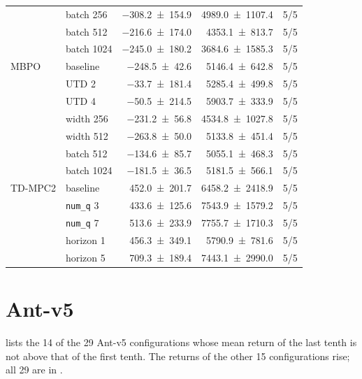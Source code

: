 {\begin{longtable}{@{}llrrr@{}}
     & batch 256 & \num{-308.2+-154.9} & \num{4989.0+-1107.4} & \num{5}/\num{5} \\
     & batch 512 & \num{-216.6+-174.0} & \num{4353.1+-813.7} & \num{5}/\num{5} \\
     & batch 1024 & \num{-245.0+-180.2} & \num{3684.6+-1585.3} & \num{5}/\num{5} \\
    \midrule
    MBPO & baseline & \num{-248.5+-42.6} & \num{5146.4+-642.8} & \num{5}/\num{5} \\
     & UTD 2 & \num{-33.7+-181.4} & \num{5285.4+-499.8} & \num{5}/\num{5} \\
     & UTD 4 & \num{-50.5+-214.5} & \num{5903.7+-333.9} & \num{5}/\num{5} \\
     & width 256 & \num{-231.2+-56.8} & \num{4534.8+-1027.8} & \num{5}/\num{5} \\
     & width 512 & \num{-263.8+-50.0} & \num{5133.8+-451.4} & \num{5}/\num{5} \\
     & batch 512 & \num{-134.6+-85.7} & \num{5055.1+-468.3} & \num{5}/\num{5} \\
     & batch 1024 & \num{-181.5+-36.5} & \num{5181.5+-566.1} & \num{5}/\num{5} \\
    \midrule
    TD-MPC2 & baseline & \num{452.0+-201.7} & \num{6458.2+-2418.9} & \num{5}/\num{5} \\
     & \texttt{num\_\allowbreak q} 3 & \num{433.6+-125.6} & \num{7543.9+-1579.2} & \num{5}/\num{5} \\
     & \texttt{num\_\allowbreak q} 7 & \num{513.6+-233.9} & \num{7755.7+-1710.3} & \num{5}/\num{5} \\
     & horizon 1 & \num{456.3+-349.1} & \num{5790.9+-781.6} & \num{5}/\num{5} \\
     & horizon 5 & \num{709.3+-189.4} & \num{7443.1+-2990.0} & \num{5}/\num{5} \\
  \end{longtable}
}

\section{Ant-v5}\label{sec:app-learn-ant}

 lists the \num{14} of the \num{29} Ant-v5 configurations whose mean return of the last tenth is not above that of the first tenth.
The returns of the other \num{15} configurations rise; all \num{29} are in .

